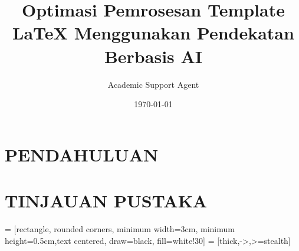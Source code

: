 \documentclass{Thesis_Class}
\title{Optimasi Pemrosesan Template LaTeX Menggunakan Pendekatan Berbasis AI}
\author{Academic Support Agent}
\date{\today}
\begin{document}
\maketitle

\begin{abstract}

\end{abstract}

\chapter{PENDAHULUAN}


\chapter{TINJAUAN PUSTAKA}


%
%
%
\usepackage{graphicx}
\usepackage[autostyle=true]{csquotes} %
\usepackage[]{babel}
\usepackage{caption}
\usepackage{wrapfig}
\captionsetup{justification=centerlast,font=small,margin=50pt}
\usepackage{subcaption}
\usepackage{float}
\usepackage{url}
\usepackage{blindtext}
\setcounter{secnumdepth}{4}
\usepackage{hyperref}
\usepackage{amsfonts}
\usepackage{amsmath}
\usepackage{amssymb}
\usepackage{amsthm}
\usepackage{mathrsfs}
\usepackage{mathtools}
\usepackage{tikz}
\usetikzlibrary{shapes.geometric, arrows}
 = [rectangle, rounded corners, minimum width=3cm, minimum height=0.5cm,text centered, draw=black, fill=white!30]
 = [thick,->,>=stealth]
\usepackage{bm}
\usepackage{multirow}
\usepackage{pdfpages}
\hypersetup{
    colorlinks,
    citecolor=black,
    filecolor=black,
    linkcolor=black,
    urlcolor=black}
\let\oldhat\hat \renewcommand{\vec}[1]{\mathbf{#1}} \renewcommand{\hat}[1]{\oldhat{\mathbf{#1}}}
\end{document}
